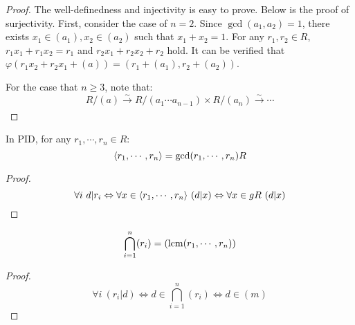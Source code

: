 \begin{proof}
    The well-definedness and injectivity is easy to prove. Below is the proof of surjectivity. First, consider the case of $n=2$. Since $\gcd(a_1, a_2) = 1$, there exists $x_1 \in (a_1), x_2 \in (a_2)$ such that $x_1 + x_2 = 1$. For any $r_1, r_2 \in R$, $r_1 x_1 + r_1 x_2 = r_1$ and $r_2 x_1 + r_2 x_2 + r_2$ hold. It can be verified that $\varphi(r_1 x_2 + r_2 x_1 + (a)) = (r_1 + (a_1), r_2 + (a_2))$.

    For the case that $n \geq 3$, note that:
    \[
        R / (a) \xrightarrow[]{\sim} R / (a_1\cdots a_{n-1}) \times R / (a_n) \xrightarrow[]{\sim} \cdots
    \]
\end{proof}






\begin{proposition}
    In PID, for any $r_1, \cdots, r_n \in R$:
    \[
        \langle r_1, \cdots, r_n \rangle = \gcd(r_1, \cdots, r_n) R
    \]
\end{proposition}
\begin{proof}
    \[
        \forall i \ d | r_i \Leftrightarrow \forall x \in  \langle r_1, \cdots, r_n \rangle \  ( d | x ) \Leftrightarrow \forall x \in gR \  (d | x)
    \]
\end{proof}



\begin{proposition}
    \[
        \bigcap_{i=1}^n (r_i) = (\operatorname{lcm}(r_1, \cdots, r_n))
    \]
\end{proposition}
\begin{proof}
    \[
        \forall i \ (r_i | d) \Leftrightarrow d \in \bigcap_{i=1}^n (r_i) \Leftrightarrow d \in (m)
    \]
\end{proof}